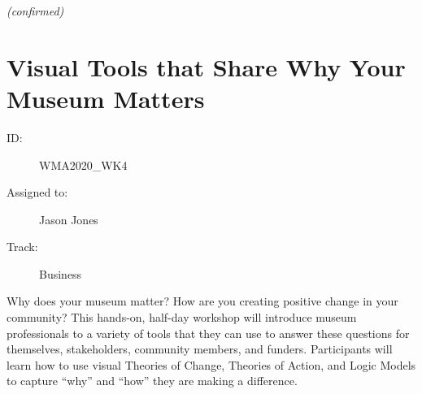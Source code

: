 \documentclass{report}
\begin{document}
                
                

                
                \emph{ (confirmed) }
              

              

              

              
        
          \newpage
          \section{ Visual Tools that Share Why Your Museum Matters  }
            \begin{description}
              \item [ID:]
              WMA2020\_WK4

              \item [Assigned to:]Jason Jones~
                \item [Track:]Business~
              \end{description}

              Why does your museum matter? How are you creating positive change in your community? This hands-on, half-day workshop will introduce museum professionals to a variety of tools that they can use to answer these questions for themselves, stakeholders, community members, and funders. Participants will learn how to use visual Theories of Change, Theories of Action, and Logic Models to capture “why” and “how” they are making a difference.
\end{document}
